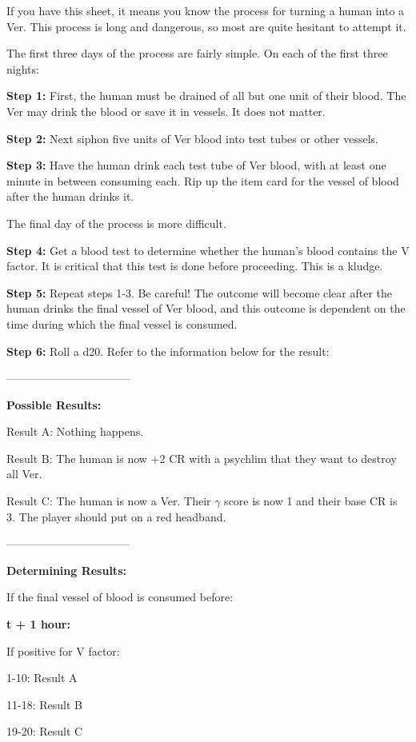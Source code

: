 \documentclass[green]{guildcamp4}
\begin{document}
\name{\gTurning{}}

If you have this sheet, it means you know the process for turning a human into a Ver. This process is long and dangerous, so most are quite hesitant to attempt it.

The first three days of the process are fairly simple. On each of the first three nights:

{\bf Step 1:} First, the human must be drained of all but one unit of their blood. The Ver may drink the blood or save it in vessels. It does not matter. 

{\bf Step 2:} Next siphon five units of Ver blood into test tubes or other vessels.

{\bf Step 3:} Have the human drink each test tube of Ver blood, with at least one minute in between consuming each. Rip up the item card for the vessel of blood after the human drinks it.

The final day of the process is more difficult.

{\bf Step 4:} Get a blood test to determine whether the human's blood contains the V factor. It is critical that this test is done before proceeding. This is a kludge.

{\bf Step 5:} Repeat steps 1-3. Be careful! The outcome will become clear after the human drinks the final vessel of Ver blood, and this outcome is dependent on the time during which the final vessel is consumed.

{\bf Step 6:} Roll a d20. Refer to the information below for the result:

---------------------------------

{\bf Possible Results:}

Result A: Nothing happens.

Result B: The human is now +2 CR with a psychlim that they want to destroy all Ver.

Result C: The human is now a Ver. Their $\gamma$ score is now 1 and their base CR is 3. The player should put on a red headband.

---------------------------------

{\bf Determining Results:}

If the final vessel of blood is consumed before:

{\bf t + 1 hour:}

If positive for V factor:

1-10: Result A

11-18: Result B

19-20: Result C
\end{document}
